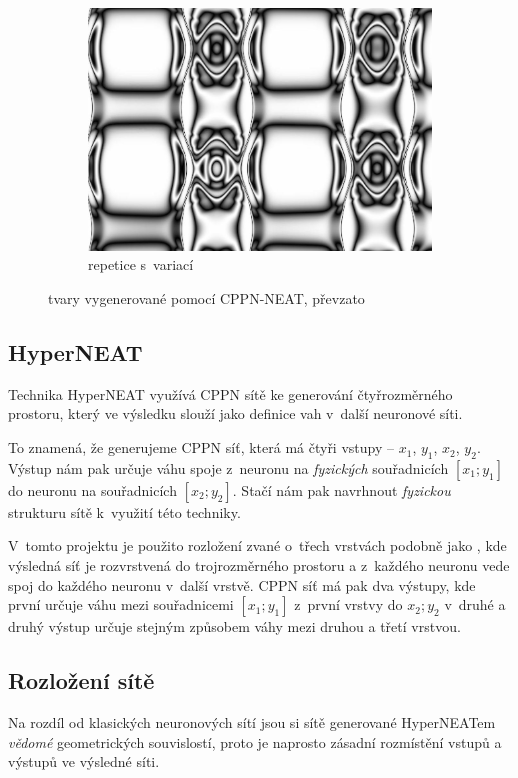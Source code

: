 \documentclass[a4]{article}
\begin{document}
\begin{figure}
\begin{subfigure}[b]{0.3\textwidth}
        \includegraphics[width=\textwidth]{cppn3}
        \caption{repetice s~variací}
        \label{fig:repvar}
    \end{subfigure}
    \caption{tvary vygenerované pomocí CPPN-NEAT, převzato\cite{hyperneat}}\label{fig:cppn}
\end{figure}
\subsection{HyperNEAT}
Technika HyperNEAT\cite{hyperneat} využívá CPPN sítě ke generování čtyřrozměrného prostoru, který ve výsledku slouží jako definice vah v~další neuronové síti.\par
To znamená, že generujeme CPPN síť, která má čtyři vstupy -- $x_1$, $y_1$, $x_2$, $y_2$. Výstup nám pak určuje váhu spoje z~neuronu na \emph{fyzických} souřadnicích $[x_1;y_1]$ do neuronu na souřadnicích $[x_2;y_2]$. Stačí nám pak navrhnout \emph{fyzickou} strukturu sítě k~využití této techniky.\par
V~tomto projektu je použito rozložení zvané \emph{}\cite{hyperneat} o~třech vrstvách podobně jako \cite{clunegait}, kde výsledná síť je rozvrstvená do trojrozměrného prostoru a z~každého neuronu vede spoj do každého neuronu v~další vrstvě. CPPN síť má pak dva výstupy, kde první určuje váhu mezi souřadnicemi $[x_1;y_1]$ z~první vrstvy do $x_2;y_2$ v~druhé a druhý výstup určuje stejným způsobem váhy mezi druhou a třetí vrstvou.\par
\subsection{Rozložení sítě}
Na rozdíl od klasických neuronových sítí jsou si sítě generované HyperNEATem \emph{vědomé} geometrických souvislostí\cite{hyperneat}, proto je naprosto zásadní rozmístění vstupů a výstupů ve výsledné síti.\par
\end{document}
